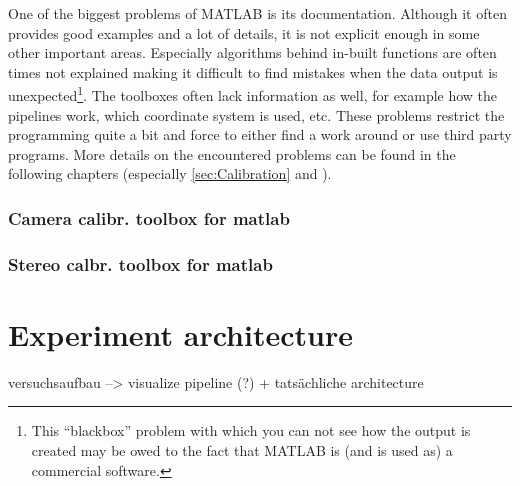One of the biggest problems of MATLAB is its documentation. Although it often provides good examples and a lot of details, it is not explicit enough in some other important areas. Especially algorithms behind in-built functions are often times not explained making it difficult to find mistakes when the data output is unexpected\footnote{This \enquote{blackbox} problem with which you can not see how the output is created may be owed to the fact that MATLAB is (and is used as) a commercial software.}. The toolboxes often lack information as well, for example how the pipelines work, which coordinate system is used, etc. These problems restrict the programming quite a bit and force to either find a work around or use third party programs. More details on the encountered problems can be found in the following chapters (especially \autoref{sec:Calibration} and ).

\subsubsection{Camera calibr. toolbox for matlab}
\subsubsection{Stereo calbr. toolbox for matlab}




\section{Experiment architecture} \label{sec:architecture}
versuchsaufbau --> visualize pipeline (?) + tatsächliche architecture
